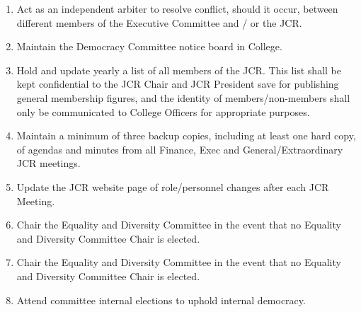 \begin{enumerate}
    \item Act as an independent arbiter to resolve conflict, should it occur, between different members of the Executive Committee and / or the JCR.
    \item Maintain the Democracy Committee notice board in College.
    \item Hold and update yearly a list of all members of the JCR. This list shall be kept confidential to the JCR Chair and JCR President save for publishing general membership figures, and the identity of members/non-members shall only be communicated to College Officers for appropriate purposes.
    \item Maintain a minimum of three backup copies, including at least one hard copy, of agendas and minutes from all Finance, Exec and General/Extraordinary JCR meetings. 
    \item Update the JCR website page of role/personnel changes after each JCR Meeting.
    \item Chair the Equality and Diversity Committee in the event that no Equality and Diversity Committee Chair is elected.
    \item Chair the Equality and Diversity Committee in the event that no Equality and Diversity Committee Chair is elected.
    \item Attend committee internal elections to uphold internal democracy.
\end{enumerate}

